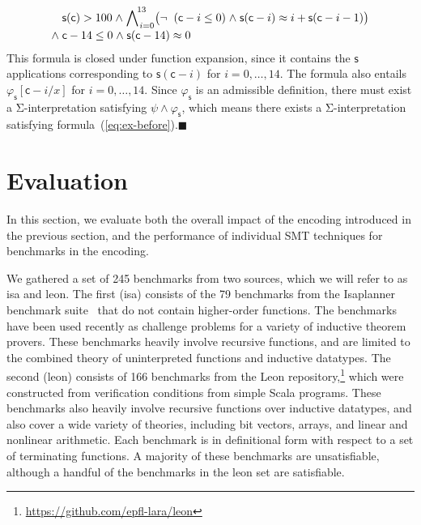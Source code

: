 \documentclass[runningheads,a4paper]{llncs}
\newcommand{\con}[1]{\mathsf{#1}}
\let\oldSigma=\Sigma
\def\Sigma{\mathrm{\oldSigma}}
\let\oldneg=\neg
\def\neg{\oldneg\;}
\let\oldwedge=\wedge
\def\wedge{\mathrel{\oldwedge}}
\newcommand\bench{\ttfamily}
\newcommand{\teq}{\approx}
\newcommand{\vthinspace}{\kern+0.083333em}
\newcommand\xend{{\hfill$\scriptstyle\blacksquare$}}
\begin{document}
\begin{example}
\begin{equation}
\begin{split}
& \con{s}( \con{c} ) > 100 \wedge %
  \bigwedge\nolimits_{\vthinspace i=0}^{\!13} \bigl( \neg (\con{c}-i \leq 0) \wedge \con{s}( \con{c}-i ) \teq i + \con{s}( \con{c}-i-1 ) \bigr) \\[-\jot]
{\wedge}\; & \con{c}-14 \leq 0 \wedge \con{s}( \con{c}-14 ) \teq 0
\end{split}
\end{equation}
%
This formula is closed under function expansion,
since it contains the $\con{s}$ applications corresponding to
$\con{s}( \con{c}-i )$ for $i = 0, \ldots, 14$. The formula also
entails $\varphi_\con{s}[\con{c}-i/x]$ for $i = 0, \ldots, 14$.
Since $\varphi_\con{s}$ is an admissible definition,
there must exist a $\Sigma$-interpretation satisfying $\psi \wedge \varphi_\con{s}$,
which means there exists a $\Sigma$-interpretation satisfying formula~(\ref{eq:ex-before}).\xend
\end{example}

\section{Evaluation}
\label{sec:evaluation}

In this section, we evaluate both the overall impact of the encoding introduced
in the previous section, and the performance of individual SMT techniques for
benchmarks in the encoding.

We gathered a set of 245 benchmarks from two sources, which we will refer to as
{\bench isa} and {\bench leon}. The first ({\bench isa}) consists of the 79
benchmarks from the Isaplanner benchmark
suite~\cite{DBLP:conf/itp/JohanssonDB10} that do not contain higher-order
functions. The benchmarks have been used recently as challenge problems for a
variety of inductive theorem provers. These benchmarks heavily involve
recursive functions, and are limited to the combined theory of uninterpreted
functions and inductive datatypes. The second ({\bench leon}) consists of 166
benchmarks from the Leon repository,\footnote{%
\url{https://github.com/epfl-lara/leon}} which were constructed from
verification conditions from simple Scala programs. These benchmarks also
heavily involve recursive functions over inductive datatypes, and also cover a
wide variety of theories, including bit vectors, arrays, and linear and
nonlinear arithmetic. Each benchmark is in definitional form with respect to a
set of terminating functions.
%
A majority of these benchmarks are unsatisfiable, although a
handful of the benchmarks in the {\bench leon} set are satisfiable.
\end{document}
